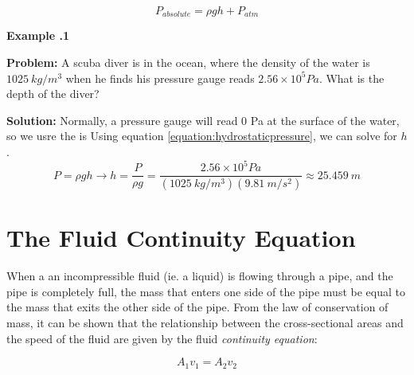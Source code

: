 \begin{mdframed}[backgroundcolor=orange!20!white]
	\begin{equation}
		P_{absolute} = \rho g h + P_{atm}
		\label{equation:absolutepressure}
	\end{equation}
\end{mdframed}	


	\begin{mdframed}[backgroundcolor=blue!10!white]
	\begin{center}
		
		
		\textbf{Example \thesection.1}	
	\end{center}
	
	\textbf{Problem: } A scuba diver is in the ocean, where the density of the water is $\SI{1025}{kg/m^3}$ when he finds his pressure gauge reads $2.56 \times 10^5 \si{Pa}$.  What is the depth of the diver?  
	\vspace{0.1in}
	
	\textbf{Solution:} Normally, a pressure gauge will read 0 Pa at the surface of the water, so we usre the   is Using equation \ref{equation:hydrostaticpressure}, we can solve for $h$.  
	\begin{equation*}
		P = \rho g h  \longrightarrow h = \frac{P}{\rho g} = \frac{2.56 \times 10^5 \si{Pa}}{(\SI{1025}{kg/m^3})(\SI{9.81}{m/s^2})} \approx \SI{25.459}{m}
	\end{equation*}
	
	
\end{mdframed}
\vspace{0.1in}



\section{The Fluid Continuity Equation}

When a an incompressible fluid (ie. a liquid) is flowing through a pipe, and the pipe is completely full, the mass that enters one side of the pipe must be equal to the mass that exits the other side of the pipe.  From the law of conservation of mass, it can be shown that the relationship between the cross-sectional areas and the speed of the fluid are given by the fluid \textit{continuity equation}:
			\begin{mdframed}[backgroundcolor=orange!20!white]
	\begin{equation}
		A_1 v_1 = A_2 v_2
		\label{equation:fluidcontinuity}
	\end{equation}
\end{mdframed}	






